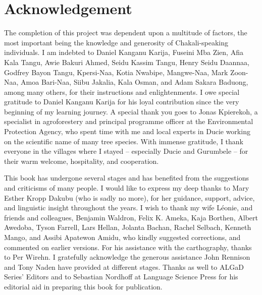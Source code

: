 \chapter*{Acknowledgement}
\label{sec:acknow}


The completion of this project was dependent upon a multitude of factors, the most important being  the  knowledge and generosity of Chakali-speaking individuals. I am  indebted to  Daniel Kanganu Karija,   Fuseini Mba Zien, Afia Kala Tangu,  Awie Bakuri Ahmed,  Seidu Kassim Tangu, Henry Seidu Daannaa, Godfrey Bayon Tangu, Kpersi-Naa\dag, Kotia Nwabipe\dag, Mangwe-Naa\dag, Mark Zoon-Naa\dag, Amoa Bari-Naa, Siibu Jakalia, Kala Osman,  and Adam Sakara Baduong, among many others,  for their instructions and enlightenments. I owe special gratitude to Daniel Kanganu Karija for his loyal contribution since the very beginning of my learning journey. A special thank you goes  to Jonas Kpierekoh, a specialist in agroforestery and principal programme officer at the  Environmental Protection Agency, who spent time with me and local experts in Ducie working on the scientific name of many tree species.  With immense gratitude, I  thank everyone in the villages where I stayed -- especially Ducie and Gurumbele --  for their warm welcome, hospitality, and cooperation. 

This book has undergone several stages and has benefited from the suggestions  and criticisms of many people.  I would like to express my deep thanks to  Mary Esther Kropp Dakubu (who is sadly no more),  for her guidance, support,  advice,  and  linguistic insight throughout the years.  I wish to thank my wife Léonie, and friends and colleagues, Benjamin Waldron,  Felix K. Ameka,  Kaja Borthen, Albert Awedoba,  Tyson Farrell, Lars Hellan, Jolanta Bachan, Rachel Selbach, Kenneth Mango, and Assibi Apatewon Amidu, who kindly suggested corrections, and commented on  earlier versions.  For his assistance with the carthography, thanks to Per Wirehn. I  gratefully  acknowledge  the  generous assistance John Rennison and   Tony Naden have provided at different stages.  Thanks as well to ALGaD Series' Editors and to  Sebastian Nordhoff at Language Science Press for his editorial aid in preparing this book for publication.